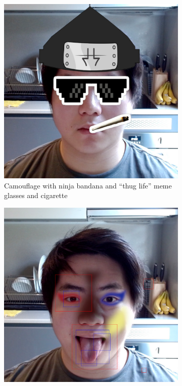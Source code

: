 \documentclass[10pt,twocolumn,letterpaper]{article}
\begin{document}
\begin{figure}[t]
    \centering
    \begin{subfigure}[b]{.49\linewidth}
        \centering
        \includegraphics[width=\linewidth]{Figures/combined.png}
        \caption{Camouflage with ninja bandana and ``thug life'' meme glasses and cigarette}
        \label{fig:thug-life}
    \end{subfigure}
    \hfill
    \begin{subfigure}[b]{.49\linewidth}
        \centering
        \includegraphics[width=\linewidth]{Figures/combined2_2.png}

\end{subfigure}
\end{figure}
\end{document}
